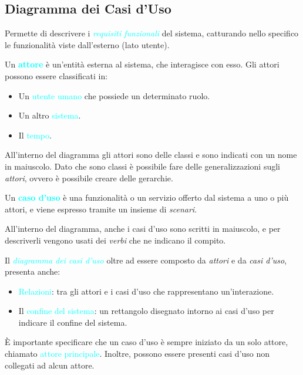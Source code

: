 \subsection{Diagramma dei Casi d'Uso}
Permette di descrivere i \emph{\textcolor{cyan}{requisiti funzionali}} del sistema, catturando nello specifico
le funzionalità viste dall'esterno (lato utente).

\begin{definition}[Attore]
    Un \textbf{\textcolor{cyan}{attore}} è un'entità esterna al sistema, che interagisce con esso.
    Gli attori possono essere classificati in:
    \begin{itemize}
        \item Un \textcolor{cyan}{utente umano} che possiede un determinato ruolo.
        \item Un altro \textcolor{cyan}{sistema}.
        \item Il \textcolor{cyan}{tempo}.
    \end{itemize}
    All'interno del diagramma gli attori sono delle classi e sono indicati con un nome in maiuscolo.
    Dato che sono classi è possibile fare delle generalizzazioni sugli \emph{attori}, ovvero è possibile creare
    delle gerarchie.
\end{definition}

\begin{definition}
    Un \textbf{\textcolor{cyan}{caso d'uso}} è una funzionalità o un servizio offerto dal sistema a uno o più attori, e viene
    espresso tramite un insieme di \emph{scenari}.

    All'interno del diagramma, anche i casi d'uso sono scritti in maiuscolo, e per descriverli vengono usati dei \emph{verbi} che ne indicano il compito.
\end{definition}

Il \emph{\textcolor{cyan}{diagramma dei casi d'uso}} oltre ad essere composto da
\emph{attori} e da \emph{casi d'uso}, presenta anche:
\begin{itemize}
    \item \textcolor{cyan}{Relazioni}: tra gli attori e i casi d'uso che rappresentano un'interazione.
    \item Il \textcolor{cyan}{confine del sistema}: un rettangolo disegnato intorno ai casi d'uso per indicare il confine del sistema.
\end{itemize}

È importante specificare che un caso d'uso è sempre iniziato da un solo attore, chiamato \textcolor{cyan}{attore principale}. Inoltre, possono
essere presenti casi d'uso non collegati ad alcun attore.

